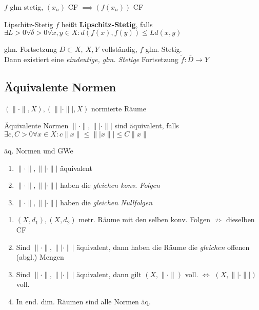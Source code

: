\begin{bemerkung}
    $f$ glm stetig, $(x_n)$ CF $\implies (f(x_n))$ CF
\end{bemerkung}

\begin{definition}{Lipschitz-Stetig}
  $f$ heißt \textbf{Lipschitz-Stetig}, falls
  $\exists L >0 \forall \delta >0 \forall x,y \in X:
  d(f(x),f(y)) \leq L d(x,y)$
\end{definition}

\begin{satz}{glm. Fortsetzung}
  $D\subset X,\ X,Y$ vollständig, $f$ glm. Stetig.\\
  Dann existiert eine \textit{eindeutige, glm. Stetige} Fortsetzung
  $\tilde{f}: \overline{D} \to Y$
\end{satz}



\subsection{Äquivalente Normen}

$(\|\cdot\|, X), (\||\cdot\||, X)$ normierte Räume\\

\begin{definition}{Äquivalente Normen}
  $\|\cdot\|, \||\cdot\||$ sind äquivalent, falls
  $\exists c,C>0 \forall x\in X: c\|x\| \leq \||x\|| \leq C \|x\|$
\end{definition}

\begin{satz}{äq. Normen und GWe}
  \begin{enumerate}[label = $\Leftrightarrow$]
    \item $\|\cdot\|, \||\cdot\||$ äquivalent
    \item $\|\cdot\|, \||\cdot\||$ haben die \textit{gleichen konv. Folgen}
    \item $\|\cdot\|, \||\cdot\||$ haben die \textit{gleichen Nullfolgen}
  \end{enumerate}
\end{satz}

\begin{bemerkung}

  \begin{enumerate}[label = (\roman*)]
    \item $(X,d_1),(X,d_2)$ metr. Räume mit den selben konv. Folgen
      $\not\Rightarrow$ dieselben CF
    \item Sind $\|\cdot\|, \||\cdot\||$ äquivalent, dann haben die Räume die
      \textit{gleichen} offenen (abgl.) Mengen
    \item Sind $\|\cdot\|, \||\cdot\||$ äquivalent, dann gilt
      $(X,\|\cdot\|)$ voll. $\Leftrightarrow$ $(X,\||\cdot\||)$ voll.
    \item In end. dim. Räumen sind alle Normen äq.
  \end{enumerate}
\end{bemerkung}



